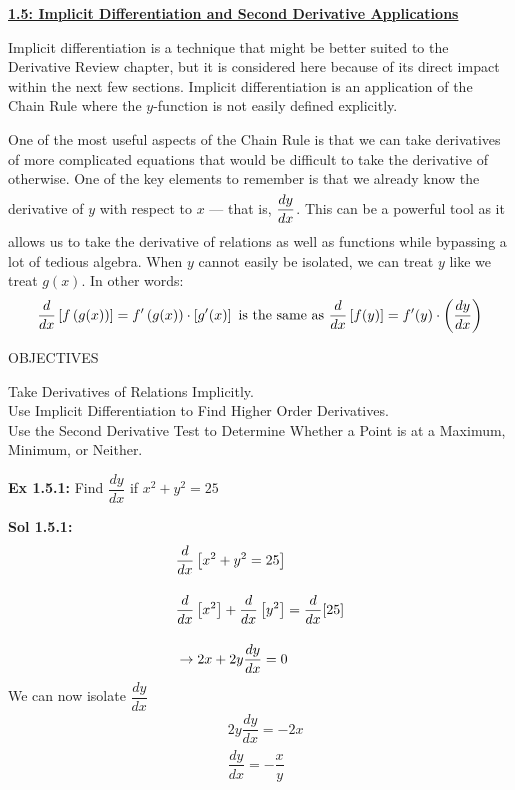 \textbf{\underline{\large{1.5: Implicit Differentiation and Second Derivative Applications}}} \par

Implicit differentiation is a technique that might be better suited to the Derivative Review chapter, but it is considered here because of its direct impact within the next few sections. Implicit differentiation is an application of the Chain Rule where the $y$-function is not easily defined explicitly. \par 

One of the most useful aspects of the Chain Rule is that we can take derivatives of more complicated equations that would be difficult to take the derivative of otherwise. One of the key elements to remember is that we already know the derivative of $y$ with respect to $x$ --- that is, $\dfrac{dy}{dx} \forcespace$. This can be a powerful tool as it allows us to take the derivative of relations as well as functions while bypassing a lot of tedious algebra. When $y$ cannot easily be isolated, we can treat $y$ like we treat $g(x)$. In other words: \begin{align*}
    \dfrac{d}{dx} \left[f\left(g(x)\right)\right] = f'\left(g(x)\right) \cdot \left[g'(x)\right] \text{ is the same as } \dfrac{d}{dx} \left[f(y)\right] = f'(y) \cdot \left(\dfrac{dy}{dx}\right)
\end{align*}

\begin{tcolorbox}[objective]
    \begin{center}
        OBJECTIVES \\[11pt]
    \end{center}
    Take Derivatives of Relations Implicitly. \\
    Use Implicit Differentiation to Find Higher Order Derivatives. \\
    Use the Second Derivative Test to Determine Whether a Point is at a Maximum, Minimum, or Neither.
\end{tcolorbox} \vspace{11pt}

\begin{tcolorbox}[example]
    \textbf{Ex 1.5.1: } Find $\dfrac{dy}{dx}$ if $x^2 + y^2 = 25$
\end{tcolorbox}
\begin{tcolorbox}[solution]
    \textbf{Sol 1.5.1: } \begin{align*}
        & \dfrac{d}{dx} \left[x^2 + y^2 = 25\right] \\[11pt]
        & \dfrac{d}{dx} \left[x^2\right] + \dfrac{d}{dx} \left[y^2\right] = \dfrac{d}{dx} [25] \\[11pt]
        & \rightarrow 2x + 2y\dfrac{dy}{dx} = 0 
    \end{align*}
    We can now isolate $\dfrac{dy}{dx}$ \begin{align*}
        & 2y\dfrac{dy}{dx} = -2x \\[11pt]
        & \dfrac{dy}{dx} = \boxed{-\dfrac{x}{y}}
    \end{align*}
\end{tcolorbox}

